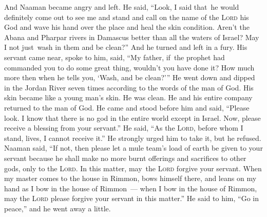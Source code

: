 \begin{inparaenum}
   And Naaman became angry and left. He said, ``Look, I said that\understood\ he would definitely come out to see me and stand and call on the name of the \textsc{Lord} his God and wave his hand over the place and heal the skin condition.%
   Aren't the Abana and Pharpar rivers in Damascus better than all the waters of Israel? May I not just\understood\ wash in them and be clean?'' And he turned and left in a fury.%
   His servant came near, spoke to him, said, ``My father, if\understood\ the prophet had commanded you to do some great thing, wouldn't you have done it? How much more then when he tells you, `Wash, and be clean?'\thinspace''%
   He went down and dipped in the Jordan River seven times according to the words of the man of God. His skin became like a young man's skin. He was clean.%
   He and his entire company returned to the man of God. He came and stood before him and said, ``Please look. I know that there is no god in the entire world except in Israel. Now, please receive a blessing from your servant.''%
   He said, ``As the \textsc{Lord}, before whom I stand, lives, I cannot receive it.'' He strongly urged him to take it, but he refused.%
   Naaman said, ``If not, then please let a mule team's load of earth be given to your servant because he shall make no more burnt offerings and sacrifices to other gods, only to the \textsc{Lord}.%
   In this matter, may\understood\ the \textsc{Lord} forgive your servant. When my master comes to the house in Rimmon, bows himself there, and leans on my hand as I bow in the house of Rimmon~--- when I bow in the house of Rimmon, may the \textsc{Lord} please forgive your servant in this matter.''%
   He said to him, ``Go in peace,'' and he went away a little.%
  

\end{inparaenum}
